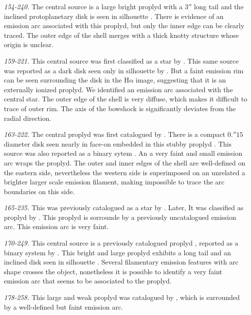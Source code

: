 \documentclass[iop, apj]{emulateapj}
\newcommand\ha{\ensuremath{\mathrm{H\alpha}}}
\begin{document}
\textit{154-240.} The central source is a large bright proplyd \cite{Bally:2000a, Ricci:2008a} with a \(3''\) long tail and the inclined protoplanetary disk is seen in silhouette \citep{Bally:2000a}. There is evidence of an emission arc associated with this proplyd, but only the inner edge can be clearly traced. The outer edge of the shell merges with a thick knotty structure whose origin is unclear.

\textit{159-221.} This central source was first classified as a star by \citet{ODell:1996a}. This same source was reported as a dark disk seen only in silhouette by \citet{Ricci:2008a}. But a faint emission rim can be seen surrounding the disk in the \ha{} image, suggesting that it is an externally ionized proplyd. We identified an emission arc associated with the central star. The outer edge of the shell is very diffuse, which  makes it difficult to trace of outer rim. The axis of the bowshock is significantly deviates from the radial direction.

\textit{163-222.} The central proplyd was first catalogued by \citet{ODell:1996a}. There is a compact \(0.''15\) diameter disk seen nearly in face-on embedded in this stubby proplyd \citep{Bally:2000a, Ricci:2008a}.  This source was also reported as a binary sytem \citep{Ricci:2008a}. An a very faint and small emission arc wraps the proplyd. The outer and inner edges of the shell are well-defined on the eastern side, nevertheless the western side is superimposed on an unrelated a brighter larger scale emission filament, making impossible to trace the arc boundaries on this side.

\textit{165-235.} This was previously catalogued as a star by \citet{ODell:1996a}. Later, It was classified as proplyd by \citet{Ricci:2008a}. This proplyd is sorrounde by a previously uncatalogued emission arc. This emission arc is very faint.

\textit{170-249.} This central source is a previously catalogued proplyd \citep{ODell:1996a}, reported as a binary system by \citet{Ricci:2008a}. This bright and large proplyd exhibits a long tail and an inclined disk seen in silhouette \citep{Bally:2000a}. Several filamentary emission features with arc shape crosses the object, nonetheless it is possible to identify a very faint emission arc that seems to be associated to the proplyd.

\textit{178-258.}  This large and weak proplyd was catalogued by \citet{Ricci:2008a}, which is surrounded by a well-defined but faint emission arc.
\end{document}
